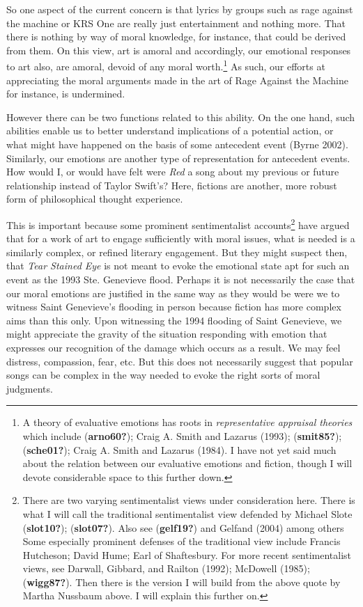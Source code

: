 \documentclass[12pt]{book}
\theoremstyle{definition}
\theoremstyle{remark}
\begin{document}
So one aspect of the current concern is that lyrics by groups such as rage against the machine or KRS One are really just entertainment and nothing more. That there is nothing by way of moral knowledge, for instance, that could be derived from them. On this view, art is amoral and accordingly, our emotional responses to art also, are amoral, devoid of any moral worth.\footnote{A theory of evaluative emotions has roots in \emph{representative appraisal theories} which include (\textbf{arno60?}); Craig A. Smith and Lazarus (1993); (\textbf{smit85?}); (\textbf{sche01?}); Craig A. Smith and Lazarus (1984). I have not yet said much about the relation between our evaluative emotions and fiction, though I will devote considerable space to this further down.} As such, our efforts at appreciating the moral arguments made in the art of Rage Against the Machine for instance, is undermined.

However there can be two functions related to this ability. On the one hand, such abilities enable us to better understand implications of a potential action, or what might have happened on the basis of some antecedent event (Byrne 2002). Similarly, our emotions are another type of representation for antecedent events. How would I, or would have felt were \emph{Red} a song about my previous or future relationship instead of Taylor Swift's? Here, fictions are another, more robust form of philosophical thought experience.

This is important because some prominent sentimentalist accounts\footnote{There are two varying sentimentalist views under consideration here. There is what I will call the traditional sentimentalist view defended by Michael Slote (\textbf{slot10?}); (\textbf{slot07?}). Also see (\textbf{gelf19?}) and Gelfand (2004) among others Some especially prominent defenses of the traditional view include Francis Hutcheson; David Hume; Earl of Shaftesbury. For more recent sentimentalist views, see Darwall, Gibbard, and Railton (1992); McDowell (1985); (\textbf{wigg87?}). Then there is the version I will build from the above quote by Martha Nussbaum above. I will explain this further on.} have argued that for a work of art to engage sufficiently with moral issues, what is needed is a similarly complex, or refined literary engagement. But they might suspect then, that \emph{Tear Stained Eye} is not meant to evoke the emotional state apt for such an event as the 1993 Ste. Genevieve flood. Perhaps it is not necessarily the case that our moral emotions are justified in the same way as they would be were we to witness Saint Genevieve's flooding in person because fiction has more complex aims than this only. Upon witnessing the 1994 flooding of Saint Genevieve, we might appreciate the gravity of the situation responding with emotion that expresses our recognition of the damage which occurs as a result. We may feel distress, compassion, fear, etc. But this does not necessarily suggest that popular songs can be complex in the way needed to evoke the right sorts of moral judgments.
\end{document}
